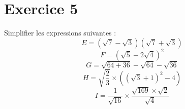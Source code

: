 \documentclass[10pt,a4paper]{article}
\begin{document}
\section{Exercice 5}
Simplifier les expressions suivantes :
\begin{equation}
E=(\sqrt{7}-\sqrt{3})(\sqrt{7}+\sqrt{3})
\end{equation}
\begin{equation}
F=(\sqrt{5}-2\sqrt{4})^2
\end{equation}
\begin{equation}
G=\sqrt{64+36}-\sqrt{64}-\sqrt{36}
\end{equation}
\begin{equation}
H=\sqrt{\frac{2}{3}}\times ((\sqrt{3}+1)^2-4)
\end{equation}
\begin{equation}
I=\frac{1}{\sqrt{16}}\times \frac{\sqrt{169} \times \sqrt{2}}{\sqrt{4}}
\end{equation}
\end{document}
